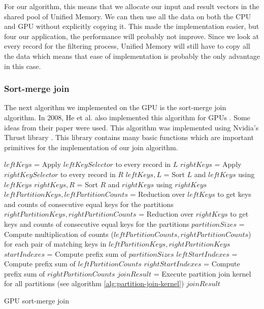 \documentclass[a4paper,titlepage]{article}
\begin{document}
For our algorithm, this means that we allocate our input and result vectors in the shared pool of Unified Memory. We can then use all the data on both the CPU and GPU without explicitly copying it. This made the implementation easier, but four our application, the performance will probably not improve. Since we look at every record for the filtering process, Unified Memory will still have to copy all the data which means that ease of implementation is probably the only advantage in this case.

\subsubsection{Sort-merge join}
The next algorithm we implemented on the GPU is the sort-merge join algorithm. In 2008, He et al. also implemented this algorithm for GPUs \cite{he2008}. Some ideas from their paper were used. This algorithm was implemented using Nvidia's Thrust library \cite{thrust}. This library contains many basic functions which are important primitives for the implementation of our join algorithm. 

\begin{algorithm}
 \label{alg:gpu-sort-merge-join}
 
 $leftKeys$ = Apply $leftKeySelector$ to every record in $L$\;
 $rightKeys$ = Apply $rightKeySelector$ to every record in $R$\;
 $leftKeys, L$ = Sort $L$ and $leftKeys$ using $leftKeys$ \;
 $rightKeys, R$ = Sort $R$ and $rightKeys$ using $rightKeys$ \;
 \;
 $leftPartitionKeys, leftPartitionCounts$ = Reduction over $leftKeys$ to get keys and counts of consecutive equal keys for the partitions \;
 $rightPartitionKeys, rightPartitionCounts$ = Reduction over $rightKeys$ to get keys and counts of consecutive equal keys for the partitions \;
 \;
 $partitionSizes$ = Compute multiplication of counts ($leftPartitionCounts, rightPartitionCounts$) for each pair of matching keys in $leftPartitionKeys, rightPartitionKeys$ \;
 \;
 $startIndexes$ = Compute prefix sum of $partitionSizes$ \;
 $leftStartIndexes$ = Compute prefix sum of $leftPartitionCounts$ \;
 $rightStartIndexes$ = Compute prefix sum of $rightPartitionCounts$ \;
 \;
 $joinResult$ = Execute partition join kernel for all partitions (see algorithm \ref{alg:partition-join-kernel})\;
 \Return $joinResult$ \;
 
 \caption{GPU sort-merge join}
\end{algorithm}
\end{document}
